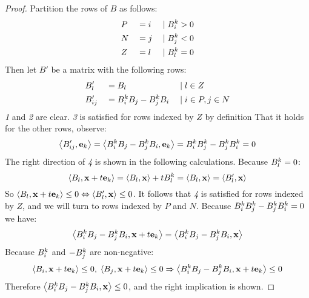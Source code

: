 \begin{proof}
	Partition the rows of $B$ as follows:
	\begin{alignat*}{3}
		 & P &  & = i & \;|\; & B^k_i > 0 \\
		 & N &  & = j & \;|\; & B^k_j < 0 \\
		 & Z &  & = l & \;|\; & B^k_l = 0
	\end{alignat*}
	Then let $B'$ be a matrix with the following rows:
	\begin{alignat*}{3}
		 & B'_l    &  & = B_l                 & \;|\; & l \in Z          \\
		 & B'_{ij} &  & = B^k_i B_j - B^k_j B_i & \;|\; & i \in P, j \in N
	\end{alignat*}
	\textit{1} and \textit{2} are clear.  \textit{3} is satisfied for rows indexed by $Z$ by definition  That it holds for the other rows, observe:
   \[\left\langle B'_{ij}, \mathbf{e}_k \right\rangle = \left\langle B^k_i B_j - B^k_j B_i, \mathbf{e}_k \right\rangle = B^k_i B^k_j - B^k_j B^k_i = 0\]
	The right direction of \textit{4} is shown in the following calculations.  Because $B^k_l = 0$:
	\[ \left\langle B_l, \mathbf{x}+t\mathbf{e}_k \right\rangle = \left\langle B_l, \mathbf{x} \right\rangle + tB^k_l = \left\langle B_l, \mathbf{x} \right\rangle = \left\langle B'_l, \mathbf{x} \right\rangle \]
	So $\left\langle B_l, \mathbf{x}+t\mathbf{e}_k \right\rangle \leq 0 \Leftrightarrow \left\langle B'_l, \mathbf{x} \right\rangle \leq 0$.  It follows that \textit{4} is satisfied for rows indexed by $Z$, and we will turn to rows indexed by $P$ and $N$. Because $B^k_i B^k_j - B^k_j B^k_i = 0$ we have:
	\[ \left\langle B^k_i B_j - B^k_j B_i, \mathbf{x} + t\mathbf{e}_k \right\rangle = \left\langle B^k_i B_j - B^k_j B_i, \mathbf{x} \right\rangle \]
	Because $B^k_i$ and $-B^k_j$ are non-negative:
	\[ \left\langle B_i, \mathbf{x}+t\mathbf{e}_k \right\rangle \leq 0,\; \left\langle B_j, \mathbf{x}+t\mathbf{e}_k \right\rangle \leq 0 \Rightarrow
		\left\langle B^k_i B_j - B^k_j B_i, \mathbf{x} + t\mathbf{e}_k \right\rangle \leq 0\]
	Therefore $\left\langle B^k_i B_j - B^k_j B_i, \mathbf{x} \right\rangle \leq 0$, and the right implication is shown.


\end{proof}
